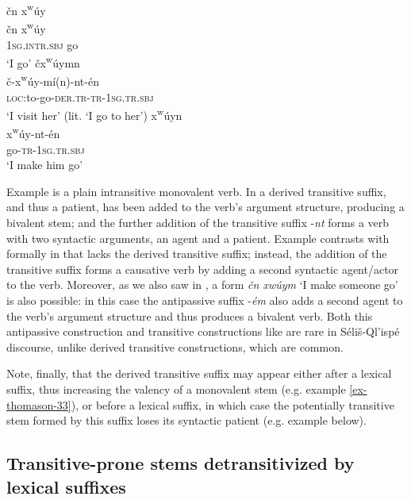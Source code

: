 \documentclass[output=paper,colorlinks,citecolor=brown]{langscibook}
\begin{document}
\ea 
\label{ex-thomason-35}
\v{c}n x\textsuperscript w\'uy \\
\gll \v{c}n x\textsuperscript w\'uy \\
\textsc{1sg}.\textsc{intr.sbj} go \\
\glt `I go'
\ex 
\label{ex-thomason-36}
\v{c}x\textsuperscript w\'uymn \\
\gll \v{c}-x\textsuperscript w\'uy-m\'i(n)-nt-\'en \\
\textsc{loc:}to-go-\textsc{der.tr-tr}-\textsc{1sg}.\textsc{tr.sbj} \\
\glt `I visit her' (lit. `I go to her')
\ex 
\label{ex-thomason-37}
x\textsuperscript w\'uyn \\
\gll x\textsuperscript w\'uy-nt-\'en \\
go-\textsc{tr}-\textsc{1sg}.\textsc{tr.sbj} \\
\glt `I make him go'
\z

Example  is a plain intransitive monovalent verb. In  a derived
transitive suffix, and thus a patient, has been added to the verb's
argument structure, producing a bivalent stem; and the further
addition of the transitive suffix -\emph{nt} forms a verb with two
syntactic arguments, an agent and a patient.  Example  contrasts with 
formally in that  lacks the derived transitive suffix; instead, the
addition of the transitive suffix forms a causative verb by adding a
second syntactic agent/actor to the verb.  Moreover, as we also saw in
, a form \emph{\v{c}n xw\'uym} `I make someone go' is also
possible: in this case the antipassive suffix -\emph{\'em} also adds a
second agent to the verb's argument structure and thus produces a
bivalent verb.  Both this antipassive construction and transitive
constructions like  are rare in S\'eli\v{s}-Ql'isp\'e discourse,
unlike derived transitive constructions, which are common.

Note, finally, that the derived transitive suffix may appear either
after a lexical suffix, thus increasing the valency of a monovalent
stem (e.g. example \ref{ex-thomason-33}), or before a lexical suffix, in which case the
potentially transitive stem formed by this suffix loses its syntactic
patient (e.g. example  below).

\subsection{Transitive-prone stems detransitivized by lexical suffixes}  %
\label{thomason_section_2.8}
\end{document}
